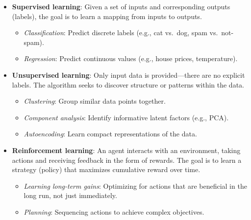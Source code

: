 \vspace{0.6em}
\begin{itemize}
    \item \textbf{Supervised learning}: Given a set of inputs and corresponding outputs (labels), the goal is to learn a mapping from inputs to outputs.
    \begin{itemize}
        \item \emph{Classification}: Predict discrete labels (e.g., cat vs.\ dog, spam vs.\ not-spam).
        \item \emph{Regression}: Predict continuous values (e.g., house prices, temperature).
    \end{itemize}
    \vspace{0.6em}

    \item \textbf{Unsupervised learning}: Only input data is provided—there are no explicit labels. The algorithm seeks to discover structure or patterns within the data.
    \begin{itemize}
        \item \emph{Clustering}: Group similar data points together.
        \item \emph{Component analysis}: Identify informative latent factors (e.g., PCA).
        \item \emph{Autoencoding}: Learn compact representations of the data.
    \end{itemize}

    \item \textbf{Reinforcement learning}: An agent interacts with an environment, taking actions and receiving feedback in the form of rewards. The goal is to learn a strategy (policy) that maximizes cumulative reward over time.
    \begin{itemize}
        \item \emph{Learning long-term gains}: Optimizing for actions that are beneficial in the long run, not just immediately.
        \item \emph{Planning}: Sequencing actions to achieve complex objectives.
    \end{itemize}
\end{itemize}


